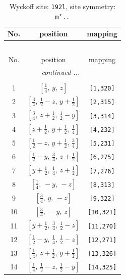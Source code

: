 \documentclass[fleqn,8pt]{jsarticle}
\begin{document}
\begin{longtable}{ccc}
\caption{Wyckoff site: {\tt 192l}, site symmetry: {\tt m'..}}
 \\
 \hline \hline
No. & position & mapping \\ \hline \endfirsthead

\multicolumn{2}{l}{\tablename\ \thetable{}} \\
 \hline \hline
No. & position & mapping \\ \hline \endhead

 \hline \hline
\multicolumn{2}{r}{\footnotesize\it continued ...} \\ \endfoot

 \hline \hline
\multicolumn{2}{r}{} \\ \endlastfoot

1 & $\left[ \frac{1}{4},\, y,\, z \right]$ & {\tt [1,320]} \\ \hline
2 & $\left[ \frac{3}{4},\, \frac{1}{2} - z,\, y + \frac{1}{2} \right]$ & {\tt [2,315]} \\ \hline
3 & $\left[ \frac{3}{4},\, z + \frac{1}{2},\, \frac{1}{2} - y \right]$ & {\tt [3,314]} \\ \hline
4 & $\left[ z + \frac{1}{2},\, y + \frac{1}{2},\, \frac{1}{4} \right]$ & {\tt [4,232]} \\ \hline
5 & $\left[ \frac{1}{2} - z,\, y + \frac{1}{2},\, \frac{3}{4} \right]$ & {\tt [5,231]} \\ \hline
6 & $\left[ \frac{1}{2} - y,\, \frac{3}{4},\, z + \frac{1}{2} \right]$ & {\tt [6,275]} \\ \hline
7 & $\left[ y + \frac{1}{2},\, \frac{1}{4},\, z + \frac{1}{2} \right]$ & {\tt [7,276]} \\ \hline
8 & $\left[ \frac{1}{4},\, - y,\, - z \right]$ & {\tt [8,313]} \\ \hline
9 & $\left[ \frac{3}{4},\, y,\, - z \right]$ & {\tt [9,322]} \\ \hline
10 & $\left[ \frac{3}{4},\, - y,\, z \right]$ & {\tt [10,321]} \\ \hline
11 & $\left[ y + \frac{1}{2},\, \frac{3}{4},\, \frac{1}{2} - z \right]$ & {\tt [11,270]} \\ \hline
12 & $\left[ \frac{1}{2} - y,\, \frac{1}{4},\, \frac{1}{2} - z \right]$ & {\tt [12,271]} \\ \hline
13 & $\left[ \frac{1}{4},\, z + \frac{1}{2},\, y + \frac{1}{2} \right]$ & {\tt [13,326]} \\ \hline
14 & $\left[ \frac{1}{4},\, \frac{1}{2} - z,\, \frac{1}{2} - y \right]$ & {\tt [14,325]} \\ \hline

\end{longtable}
\end{document}

